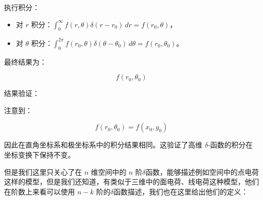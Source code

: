 \documentclass[lang=cn,10pt,newtx,bibend=biber,device=pad]{elegantbook}
\begin{document}
\begin{example}
执行积分：
\begin{itemize}
    \item 对 $r$ 积分：$\int_0^\infty f(r, \theta) \delta(r - r_0) \, dr = f(r_0, \theta)$，
    \item 对 $\theta$ 积分：$\int_0^{2\pi} f(r_0, \theta) \delta(\theta - \theta_0) \, d\theta = f(r_0, \theta_0)$。
\end{itemize}

最终结果为：

\begin{equation}
f(r_0, \theta_0)
\end{equation}

结果验证：

注意到：

\begin{equation}
f(r_0, \theta_0) = f(x_0, y_0)
\end{equation}

因此在直角坐标系和极坐标系中的积分结果相同。这验证了高维 $\delta$-函数的积分在坐标变换下保持不变。
\end{example}
但是我们这里只关心了在 $n$ 维空间中的 $n$ 阶$\delta$函数，能够描述例如空间中的点电荷这样的模型，但是我们还知道，有类似于三维中的面电荷、线电荷这种模型，他们在阶数上来看可以使用 $n-k$ 阶的$\delta$函数描述，我们也在这里给出他们的定义\cite{schutz1980geometrical}：
\end{document}
